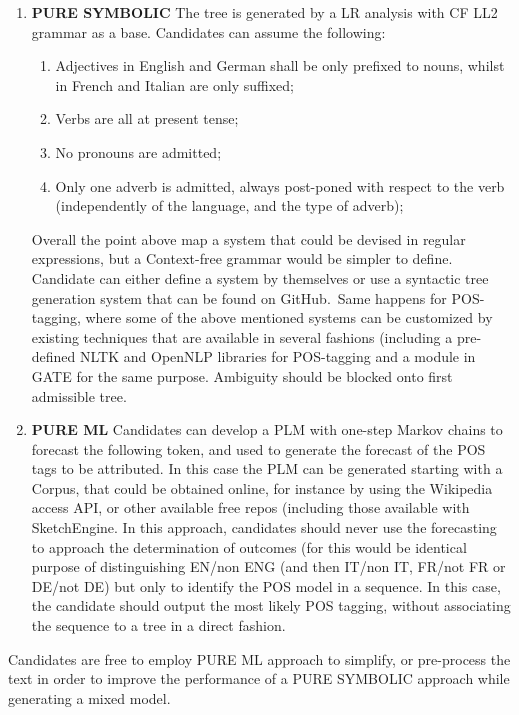 \documentclass{article}
\begin{document}
    \begin{enumerate}
        \item \textbf{PURE SYMBOLIC} The tree is generated by a LR analysis with CF LL2 grammar as a base. Candidates can assume the following:
            \begin{enumerate}
                \item Adjectives in English and German shall be only prefixed to nouns, whilst in French and Italian are only suffixed;
                \item Verbs are all at present tense;
                \item No pronouns are admitted;
                \item Only one adverb is admitted, always post-poned with respect to the verb (independently of the language, and the type of adverb);
            \end{enumerate}
            Overall the point above map a system that could be devised in regular expressions, but a Context-free grammar would be simpler to define. Candidate can either define a system by themselves or use a syntactic tree generation system that can be found on GitHub.\
            Same happens for POS-tagging, where some of the above mentioned systems can be customized by existing techniques that are available in several fashions (including a pre-defined NLTK and OpenNLP libraries for POS-tagging and a module in GATE for the same purpose. Ambiguity should be blocked onto first admissible tree.
        \item \textbf{PURE ML} Candidates can develop a PLM with one-step Markov chains to forecast the following token, and used to generate the forecast of the POS tags to be attributed. In this case the PLM can be generated starting with a Corpus, that could be obtained online, for instance by using the Wikipedia access API, or other available free repos (including those available with SketchEngine. In this approach, candidates should never use the forecasting to approach the determination of outcomes (for this would be identical purpose of distinguishing EN/non ENG (and then IT/non IT, FR/not FR or DE/not DE) but only to identify the POS model in a sequence. In this case, the candidate should output the most likely POS tagging, without associating the sequence to a tree in a direct fashion.    
    \end{enumerate} 
    Candidates are free to employ PURE ML approach to simplify, or pre-process the text in order to improve the performance of a PURE SYMBOLIC approach while generating a mixed model.
\end{document}
